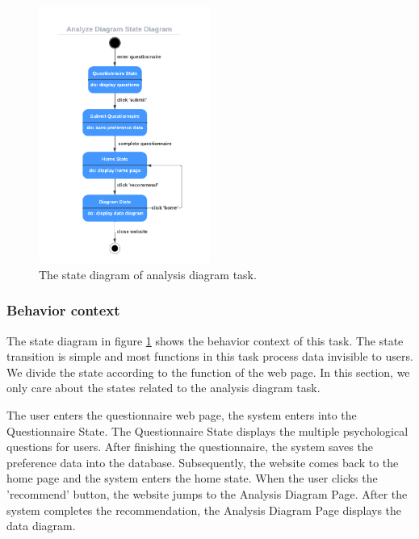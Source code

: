 \documentclass[conference]{IEEEtran}
\begin{document}
\begin{figure}[htbp]
\centerline{\includegraphics[width=0.5\textwidth]{diagram_state_diagram.pdf}}
\caption{The state diagram of analysis diagram task.}
\label{diagram_state_diagram}
\end{figure}


\subsubsection{\textbf{Behavior context }}

\textbf{}

The state diagram in figure \ref{diagram_state_diagram} shows the behavior context of this task. The state transition is simple and most functions in this task process data invisible to users. We divide the state according to the function of the web page. In this section, we only care about the states related to the analysis diagram task.

The user enters the questionnaire web page, the system enters into the Questionnaire State. The Questionnaire State displays the multiple psychological questions for users. After finishing the questionnaire, the system saves the preference data into the database. Subsequently, the website comes back to the home page and the system enters the home state. When the user clicks the 'recommend' button, the website jumps to the Analysis Diagram Page. After the system completes the recommendation, the Analysis Diagram Page displays the data diagram. 
\end{document}

